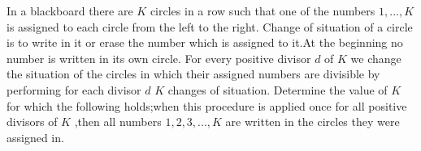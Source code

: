 In a blackboard there are $K$ circles in a row such that one of the numbers $1,...,K$ is assigned to each circle from the left to the right.
Change of situation of a circle is to write in it or erase the number which is assigned to it.At the beginning no number is written in its own circle.
For every positive divisor $d$ of $K$  we change the situation of the circles in which their assigned numbers are divisible by performing for each divisor $d$ $K$ changes of situation.
Determine the value of $K$ for which the following holds;when this procedure is applied once for all positive divisors of $K$ ,then all numbers $1,2,3,...,K$ are written in the circles they were assigned in.
